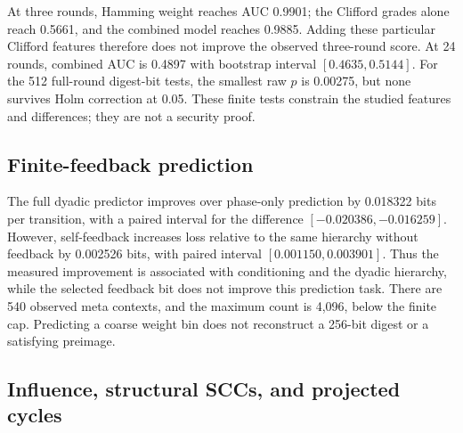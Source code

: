 \documentclass[11pt]{article}
\begin{document}
\begin{table}[htbp]
\centering\small
\AUCTable
\caption{Test AUC for fixed feature families. The true-difference class is positive, with score orientation chosen on training data. Scores below 0.5 are retained without a post-test sign flip.}
\end{table}

At three rounds, Hamming weight reaches AUC 0.9901; the Clifford grades alone reach 0.5661, and the combined model reaches 0.9885. Adding these particular Clifford features therefore does not improve the observed three-round score. At 24 rounds, combined AUC is 0.4897 with bootstrap interval $[0.4635,0.5144]$. For the 512 full-round digest-bit tests, the smallest raw $p$ is 0.00275, but none survives Holm correction at 0.05. These finite tests constrain the studied features and differences; they are not a security proof.

\subsection{Finite-feedback prediction}

\begin{table}[htbp]
\centering\small
\MarkovTable
\caption{Held-out average next-bin log loss over 24 transitions per trajectory. Lower is better. Intervals use 4,096 independent test trajectories.}
\end{table}

The full dyadic predictor improves over phase-only prediction by 0.018322 bits per transition, with a paired interval for the difference $[-0.020386,-0.016259]$. However, self-feedback increases loss relative to the same hierarchy without feedback by 0.002526 bits, with paired interval $[0.001150,0.003901]$. Thus the measured improvement is associated with conditioning and the dyadic hierarchy, while the selected feedback bit does not improve this prediction task. There are 540 observed meta contexts, and the maximum count is 4,096, below the finite cap. Predicting a coarse weight bin does not reconstruct a 256-bit digest or a satisfying preimage.

\subsection{Influence, structural SCCs, and projected cycles}

\begin{table}[htbp]
\centering\small
\CausalTable
\caption{Keccak-f[25] intervention and correlation summaries, averaged over 625 input/output pairs. Signed effects and Pearson correlations can cancel while flip influence remains large.}
\end{table}
\end{document}
